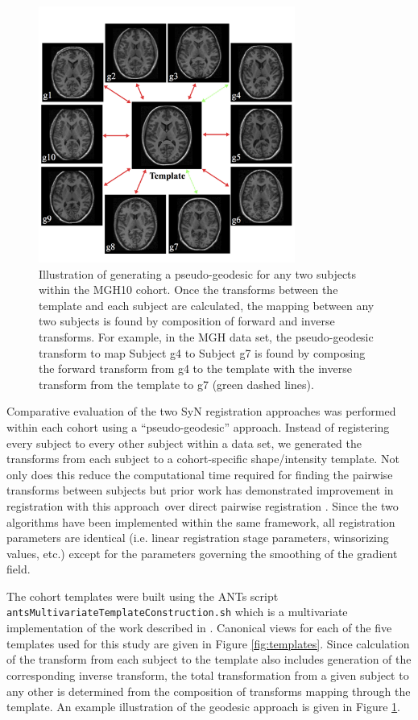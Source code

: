 \documentclass{frontiersSCNS}
\begin{document}
\begin{figure}[htb]
  \centering
  \includegraphics[width=0.75\textwidth]{pseudo_geodesic.jpg}
  \caption{Illustration of generating a pseudo-geodesic for any two subjects
  within the MGH10 cohort.  Once the transforms between the
  template and each subject are calculated, the mapping between any two
  subjects is found by composition of forward and inverse transforms.  For
  example, in the MGH data set, the pseudo-geodesic transform to
  map Subject g4 to Subject g7 is found by composing the forward
  transform from g4 to the template with the inverse transform from the
  template to g7 (green dashed lines).
  }
  \label{fig:pseudo_geodesic}
\end{figure}

Comparative evaluation of the two SyN registration approaches was performed 
within each cohort using a ``pseudo-geodesic'' approach.  Instead of
registering every subject to every other subject within a data set,
we generated the transforms from each subject to a cohort-specific
shape/intensity template.  Not only does this reduce the computational
time required for finding the pairwise transforms between subjects but 
prior work has demonstrated  improvement in registration with this approach\
over direct pairwise registration \citep{klein2010a}.  Since the two algorithms
have been implemented within the same framework, all registration parameters are 
identical (i.e. linear registration stage parameters, winsorizing values, etc.) 
except for the parameters governing the smoothing of the gradient field. 

The cohort templates were built using the ANTs script {\tt antsMultivariateTemplateConstruction.sh}
which is a multivariate implementation of the work described in
\cite{avants2010}. Canonical views for each of the five templates
used for this study are given in Figure \ref{fig:templates}.  
Since calculation of the transform from each subject to the template also
includes generation of the corresponding inverse transform, the total
transformation from a given subject to any other is determined from the composition
of transforms mapping through the template.  An example illustration of the
geodesic approach is given in Figure \ref{fig:pseudo_geodesic}.
\end{document}
